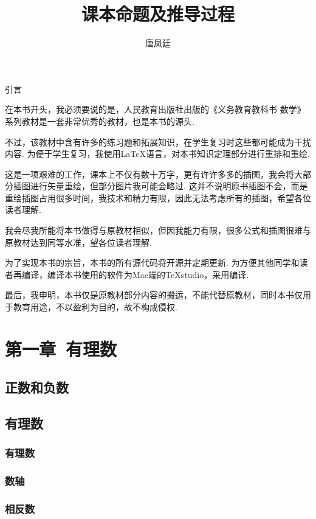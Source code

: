 \documentclass[UTF8,fontset=macnew]{book} %
\title{课本命题及推导过程}
\author{唐凤廷}
\begin{document}
\maketitle %
{\fangsong
\begin{center}
	引言
\end{center}

在本书开头，我必须要说的是，人民教育出版社出版的《义务教育教科书 数学》系列教材是一套非常优秀的教材，也是本书的源头.

不过，该教材中含有许多的练习题和拓展知识，在学生复习时这些都可能成为干扰内容. 为便于学生复习，我使用\LaTeX 语言，对本书知识定理部分进行重排和重绘.

这是一项艰难的工作，课本上不仅有数十万字，更有许许多多的插图，我会将大部分插图进行矢量重绘，但部分图片我可能会略过. 这并不说明原书插图不会，而是重绘插图占用很多时间，我技术和精力有限，因此无法考虑所有的插图，希望各位读者理解.

我会尽我所能将本书做得与原教材相似，但因我能力有限，很多公式和插图很难与原教材达到同等水准，望各位读者理解.

为了实现本书的宗旨，本书的所有源代码将开源并定期更新. 为方便其他同学和读者再编译，编译本书使用的软件为Mac端的TeXstudio，采用\LaTeXe 编译.

最后，我申明，本书仅是原教材部分内容的搬运，不能代替原教材，同时本书仅用于教育用途，不以盈利为目的，故不构成侵权.
}
\tableofcontents %

	\chapter{第一章\ 有理数}
		\section{正数和负数}
		
		\section{有理数}
			\subsection{有理数}
			
			\subsection{数轴}
			
			\subsection{相反数}
			
\end{document}
